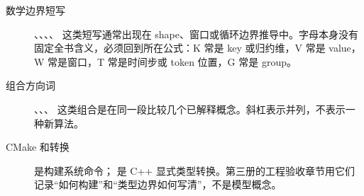 \begin{description}
  \item[数学边界短写] 、、、、 这类短写通常出现在 shape、窗口或循环边界推导中。字母本身没有固定全书含义，必须回到所在公式：K 常是 key 或归约维，V 常是 value，W 常是窗口，T 常是时间步或 token 位置，G 常是 group。
  \item[组合方向词] 、、、 这类组合是在同一段比较几个已解释概念。斜杠表示并列，不表示一种新算法。
  \item[CMake 和转换]  是构建系统命令； 是 C++ 显式类型转换。第三册的工程验收章节用它们记录“如何构建”和“类型边界如何写清”，不是模型概念。
\end{description}
